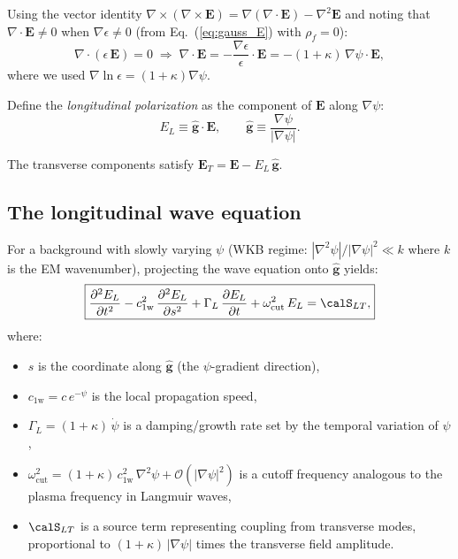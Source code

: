 \documentclass[aps,prd,twocolumn,superscriptaddress,nofootinbib,floatfix]{revtex4-2}
\newcommand{\psifield}{\psi}
\newcommand{\cfield}{c_{\text{1w}}}
\newcommand{\cvac}{c}
\newcommand{\Evec}{\mathbf{E}}
\newcommand{\Order}{\mathcal{O}}
\begin{document}
Using the vector identity
$\nabla\times(\nabla\times\Evec) = \nabla(\nabla\cdot\Evec) -
\nabla^2\Evec$ and noting that $\nabla\cdot\Evec \neq 0$ when
$\nabla\epsilon \neq 0$ (from Eq.~(\ref{eq:gauss_E}) with
$\rho_f = 0$):
\begin{equation}
\nabla\cdot(\epsilon\,\Evec) = 0 \;\Rightarrow\;
\nabla\cdot\Evec = -\frac{\nabla\epsilon}{\epsilon}\cdot\Evec
= -(1+\kappa)\,\nabla\psifield\cdot\Evec,
\label{eq:div_E_nonzero}
\end{equation}
where we used
$\nabla\ln\epsilon = (1+\kappa)\nabla\psifield$.

Define the \emph{longitudinal polarization} as the component of
$\Evec$ along $\nabla\psifield$:
\begin{equation}
E_L \equiv \hat{\mathbf{g}}\cdot\Evec, \qquad
\hat{\mathbf{g}} \equiv \frac{\nabla\psifield}{|\nabla\psifield|}.
\label{eq:E_longitudinal}
\end{equation}

The transverse components satisfy
$\Evec_T = \Evec - E_L\,\hat{\mathbf{g}}$.

\subsection{The longitudinal wave equation}

For a background with slowly varying $\psifield$ (WKB regime:
$|\nabla^2\psifield|/|\nabla\psifield|^2 \ll k$ where $k$ is
the EM wavenumber), projecting the wave equation onto
$\hat{\mathbf{g}}$ yields:
\begin{equation}
\boxed{
\frac{\partial^2 E_L}{\partial t^2}
- \cfield^2\,\frac{\partial^2 E_L}{\partial s^2}
+ \Gamma_L\,\frac{\partial E_L}{\partial t}
+ \omega_{\text{cut}}^2\,E_L = \calS_{LT},
}
\label{eq:longitudinal_wave}
\end{equation}
where:
\begin{itemize}
\item $s$ is the coordinate along $\hat{\mathbf{g}}$
(the $\psifield$-gradient direction),

\item $\cfield = \cvac\,e^{-\psifield}$ is the local propagation
speed,

\item $\Gamma_L = (1+\kappa)\,\dot\psifield$ is a damping/growth
rate set by the temporal variation of $\psifield$,

\item $\omega_{\text{cut}}^2 = (1+\kappa)\,\cfield^2\,
\nabla^2\psifield + \Order(|\nabla\psifield|^2)$ is a cutoff
frequency analogous to the plasma frequency in Langmuir waves,

\item $\calS_{LT}$ is a source term representing coupling from
transverse modes, proportional to $(1+\kappa)\,|\nabla\psifield|$
times the transverse field amplitude.
\end{itemize}
\end{document}
